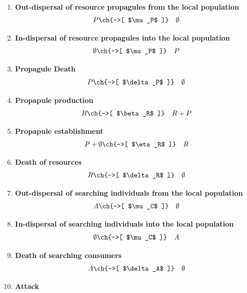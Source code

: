 \begin{enumerate}
	\item \bfseries{Out-dispersal of resource propagules from the local population}
	\begin{eqnarray}
	P  & \ch{->[ $\mu_P$ ]} & \emptyset \label{outPopagule}
	\end{eqnarray}
	\item \bfseries{In-dispersal of resource propagules into the local population}
	\begin{eqnarray}
	\emptyset  & \ch{->[ $\mu_P$ ]} & P \label{inPopagule}
	\end{eqnarray}
	\item \bfseries{Propagule Death}
	\begin{eqnarray}
	P   & \ch{->[ $\delta_P$ ]} & \emptyset \label{PopaguleDeath}
	\end{eqnarray}
	\item \bfseries{Propapule production}
	\begin{eqnarray}
	 R & \ch{->[ $\beta_R$ ]} & R + P \label{Birth_P}
	\end{eqnarray}
	\item \bfseries{Propapule establishment}
	\begin{eqnarray}
	P + \emptyset & \ch{->[ $\eta_R$ ]} & R \label{Establishment_P}
	\end{eqnarray}		
	\item \bfseries{Death of resources}
	\begin{eqnarray}
	R  & \ch{->[ $\delta_R$ ]} & \emptyset \label{Death_R}
	\end{eqnarray}
	\item \bfseries{Out-dispersal of searching individuals from the local population}
	\begin{eqnarray}
	A  & \ch{->[ $\mu_C$ ]} & \emptyset \label{outSearching}
	\end{eqnarray}
	\item \bfseries{In-dispersal of searching individuals into the local population}
	\begin{eqnarray}
	\emptyset  & \ch{->[ $\mu_C$ ]} & A \label{inSearching}
	\end{eqnarray}
	\item \bfseries{Death of searching consumers}
	\begin{eqnarray}
	A  & \ch{->[ $\delta_A$ ]} & \emptyset \label{Death_A}
	\end{eqnarray}
	\item \bfseries{Attack}
	\begin{eqnarray}

\end{eqnarray}
\end{enumerate}
